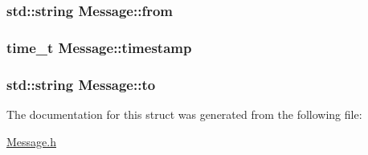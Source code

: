 \subsubsection[{\texorpdfstring{from}{from}}]{\setlength{\rightskip}{0pt plus 5cm}std\+::string Message\+::from}\hypertarget{structMessage_a9d1b7342dff5fedbef018e9517820263}{}\label{structMessage_a9d1b7342dff5fedbef018e9517820263}
\subsubsection[{\texorpdfstring{timestamp}{timestamp}}]{\setlength{\rightskip}{0pt plus 5cm}time\+\_\+t Message\+::timestamp}\hypertarget{structMessage_a23d8be7ab171d014f7286587b8d1c16b}{}\label{structMessage_a23d8be7ab171d014f7286587b8d1c16b}
\subsubsection[{\texorpdfstring{to}{to}}]{\setlength{\rightskip}{0pt plus 5cm}std\+::string Message\+::to}\hypertarget{structMessage_a094146d3f34095c1ab1395cd06c91c06}{}\label{structMessage_a094146d3f34095c1ab1395cd06c91c06}


The documentation for this struct was generated from the following file\+:\begin{DoxyCompactItemize}
\item 
\hyperlink{Message_8h}{Message.\+h}\end{DoxyCompactItemize}
